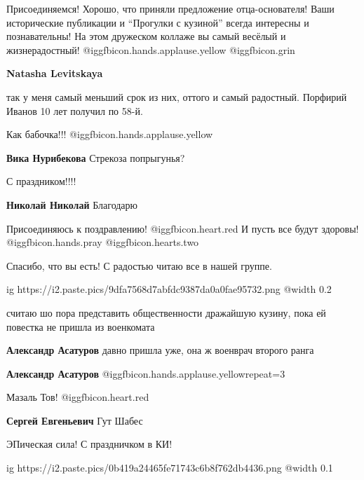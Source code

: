  
 
 
 
 
\zzSecCmt

\begin{itemize} %

Присоединяемся! Хорошо, что приняли предложение отца-основателя! Ваши
исторические публикации и \enquote{Прогулки с кузиной} всегда интересны и
познавательны! На этом дружеском коллаже вы самый весёлый и жизнерадостный!
@igg{fbicon.hands.applause.yellow}  @igg{fbicon.grin} 

\textbf{Natasha Levitskaya} 

так у меня самый меньший срок из них, оттого и самый радостный. Порфирий Иванов
10 лет получил по 58-й.

Как бабочка!!! @igg{fbicon.hands.applause.yellow} 

\textbf{Вика Нурибекова} Стрекоза попрыгунья?

С праздником!!!!

\textbf{Николай Николай} Благодарю


Присоединяюсь к поздравлению!  @igg{fbicon.heart.red} И пусть все будут
здоровы! @igg{fbicon.hands.pray}  @igg{fbicon.hearts.two} 

Спасибо, что вы есть! С радостью читаю все в нашей группе.


\ifcmt
  ig https://i2.paste.pics/9dfa7568d7abfdc9387da0a0fae95732.png
  @width 0.2
\fi


считаю шо пора представить общественности дражайшую кузину, пока ей повестка не
пришла из военкомата

\begin{itemize} %
\textbf{Александр Асатуров} давно пришла уже, она ж военврач второго ранга

\textbf{Александр Асатуров}  @igg{fbicon.hands.applause.yellow}{repeat=3} 
\end{itemize} %

Мазаль Тов! @igg{fbicon.heart.red}

\textbf{Сергей Евгеньевич} Гут Шабес

ЭПическая сила! С праздничком в КИ!


\ifcmt
  ig https://i2.paste.pics/0b419a24465fe71743c6b8f762db4436.png
  @width 0.1
\fi



\end{itemize} %
